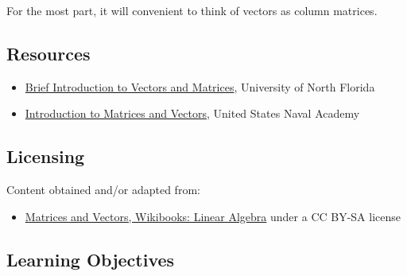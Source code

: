 For the most part, it will convenient to think of vectors as column matrices.




\subsection{Resources}
\label{sss:reso-55b5}




\begin{itemize}
    \item \href{https://www.unf.edu/\textasciitilde{}mzhan/chapter3.pdf}{Brief Introduction to Vectors and Matrices}, University of North Florida
    \item \href{https://www.usna.edu/Users/math/uhan/sm286a/lessons/02.pdf}{Introduction to Matrices and Vectors}, United States Naval Academy
\end{itemize}


\subsection{Licensing}
\label{sss:lice-7352}




Content obtained and/or adapted from:



\begin{itemize}
    \item \href{https://en.wikibooks.org/wiki/Linear_Algebra/Matrices_and_Vectors/}{Matrices and Vectors, Wikibooks: Linear Algebra} under a CC BY-SA license
\end{itemize}


\subsection{Learning Objectives}
\label{ssec:lear-fe6e}


